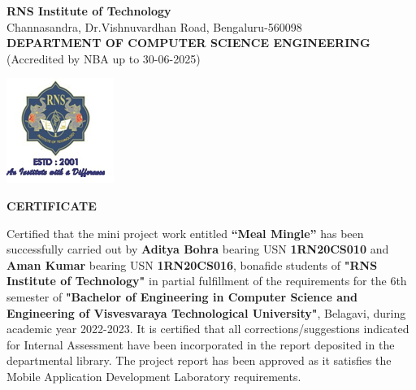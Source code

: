 
\newenvironment{certificate1}
	\clearpage\thispagestyle{}
	
	\begin{center}	
			\textbf{\Large RNS Institute of Technology}\\
{\footnotesize{Channasandra, Dr.Vishnuvardhan Road, Bengaluru-560098}}\\
\textbf{DEPARTMENT OF COMPUTER SCIENCE  ENGINEERING} \\
{\footnotesize{(Accredited by NBA up to 30-06-2025)}}\\
\end{center}
	
	\begin{center}
		\includegraphics[scale=0.8]{logo.png}	
	\end{center}
	\begin{center}
		\textbf{CERTIFICATE}
	\end{center}
	
Certified that the mini project work entitled \textbf{“Meal Mingle”} has been successfully carried out by  \textbf{Aditya Bohra}  bearing USN  \textbf{1RN20CS010} and \textbf{Aman Kumar} bearing USN  \textbf{1RN20CS016}, bonafide students of  \textbf{"RNS Institute of Technology"} in partial fulfillment of the requirements for the 6th semester  of  \textbf{"Bachelor of Engineering in Computer Science and Engineering of Visvesvaraya Technological University"}, Belagavi, during academic year 2022-2023. It is certified that all corrections/suggestions indicated for Internal Assessment have been incorporated in the report deposited in the departmental library. The project report has been approved as it satisfies the Mobile Application Development Laboratory requirements. 	
\\
	
